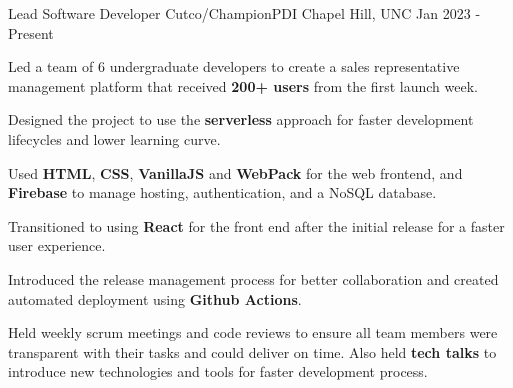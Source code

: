 
\begin{cventries}
  \cventry
    {Lead Software Developer} %
    {Cutco/ChampionPDI} %
    {Chapel Hill, UNC} %
    {Jan 2023 - Present} %
    {
      \begin{cvitems} %
        \item {Led a team of 6 undergraduate developers to create a sales representative management platform that received \textbf{200+ users} from the first launch week.}
        \item {Designed the project to use the \textbf{serverless} approach for faster development lifecycles and lower learning curve.}
        \item {Used \textbf{HTML}, \textbf{CSS}, \textbf{VanillaJS} and \textbf{WebPack} for the web frontend, and \textbf{Firebase} to manage hosting, authentication, and a NoSQL database.}
        \item {Transitioned to using \textbf{React} for the front end after the initial release for a faster user experience.}
        \item {Introduced the release management process for better collaboration and created automated deployment using \textbf{Github Actions}.}
        \item {Held weekly scrum meetings and code reviews to ensure all team members were transparent with their tasks and could deliver on time. Also held \textbf{tech talks} to introduce new technologies and tools for faster development process.}
      \end{cvitems}
    }


\end{cventries}
